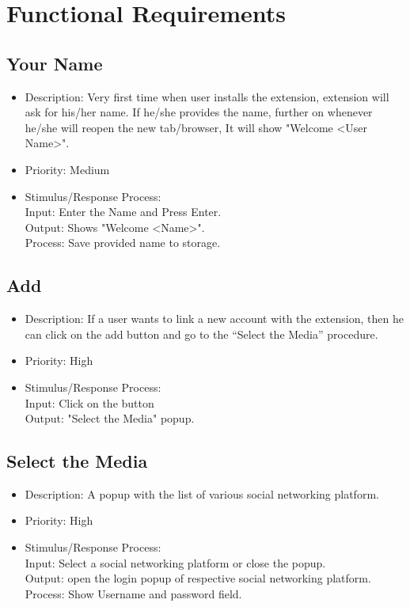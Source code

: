 \documentclass[12pt]{article}
\begin{document}
\section{Functional Requirements}
\subsection{Your Name}
\begin{itemize}
\item Description: Very first time when user installs the extension, extension will ask for his/her name. If he/she provides the name, further on whenever he/she will reopen the new tab/browser, It will show "Welcome <User Name>".

\item Priority: Medium

\item Stimulus/Response Process:\\
Input: Enter the Name and Press Enter.\\
Output: Shows "Welcome <Name>".\\
Process: Save provided name to storage.


\end{itemize}
\subsection{Add}
\begin{itemize}
    \item Description: If a user wants to link a new account with the
extension, then he can click on the add button and go to the
“Select the Media” procedure. 
    \item Priority: High
    \item 
 Stimulus/Response Process:\\
Input: Click on the button\\
Output: "Select the Media" popup.
\end{itemize}

\subsection{Select the Media}
\begin{itemize}
    \item Description: A popup with the list of various social networking
platform.
    \item Priority: High 
    \item Stimulus/Response Process:\\
Input: Select a social networking platform or close the
popup.\\
Output: open the login popup of respective social
networking platform.\\
Process: Show Username and password field.
\end{itemize}
\end{document}
